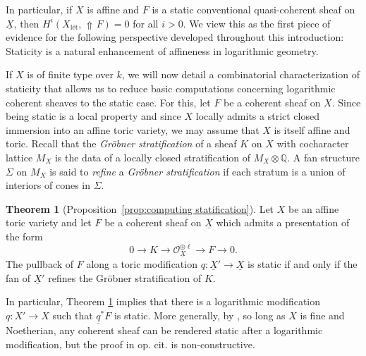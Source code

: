 \documentclass[11pt]{amsart}
\theoremstyle{definition}
\theoremstyle{definition}
\newtheorem{maintheorem}{Theorem}
\DeclareMathOperator{\arrowup}{\!\Uparrow \!}
\newcommand{\ul}[1]{\underline{#1}}
\begin{document}
In particular, if $X$ is affine and $F$ is a static conventional quasi-coherent sheaf on $\ul{X}$, then $H^i(X_{\text{l\'et}},\arrowup F)=0$ for all $i>0$. We view this as the first piece of evidence for the following perspective developed throughout this introduction: Staticity is a natural enhancement of affineness in logarithmic geometry.

If $X$ is of finite type over $k$, we will now detail a combinatorial characterization of staticity that allows us to reduce basic computations concerning logarithmic coherent sheaves to the static case. For this, let $F$ be a coherent sheaf on $X$. Since being static is a local property and since $X$ locally admits a strict closed immersion into an affine toric variety, we may assume that $X$ is itself affine and toric.
Recall that the \textit{Gr\"obner stratification} \cite{kennedy2023logarithmic,kennedy2025logarithmic} of a sheaf $K$ on $X$ with cocharacter lattice $M_X$ is the data of a locally closed stratification of $M_X\otimes \mathbb{Q}$. A fan structure $\Sigma$ on $M_X$ is said to \textit{refine} a \textit{Gr\"obner stratification} if each stratum is a union of interiors of cones in $\Sigma$. 
\begin{maintheorem}[Proposition~\ref{prop:computing statification}]\label{main theorem: Grobner strat}
     Let $X$ be an affine toric variety and let $F$ be a coherent sheaf on $\ul{X}$ which admits a presentation of the form $$0 \longrightarrow {K}\longrightarrow \mathcal{O}_{\ul{X}}^{\oplus \ell} \longrightarrow F \longrightarrow 0.$$
     The pullback of $F$ along a toric modification $q\colon \ul{X}'\rightarrow \ul{X}$ is static if and only if the fan of $\ul{X}'$ refines the Gr\"obner stratification of $K$.
\end{maintheorem}
In particular, Theorem \ref{main theorem: Grobner strat} implies that there is a logarithmic modification $q\colon X'\rightarrow X$ such that $\ul{q}^*F$ is static. More generally, by \cite[Corollary 3.3.5]{on-toric-log-schemes}, so long as $X$ is fine and Noetherian, any coherent sheaf can be rendered static after a logarithmic modification, but the proof in op. cit. is non-constructive.
\end{document}
